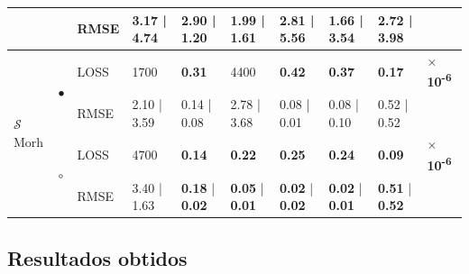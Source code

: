 \begin{table}
{\begin{tabular}{*{10}l}
            &                            & RMSE & 3.17 | 4.74                   & 2.90 | 1.20                   & 1.99 | 1.61                   & 2.81 | 5.56                   & 1.66 | 3.54                   & 2.72 | 3.98                   &                                          \\
            \hline
            \hline
            \multirow{4}{*}{$\mathcal{S}$Morh} & \multirow{2}{*}{$\bullet$} & LOSS & 1700                          & \textbf{0.31} & 4400 & \textbf{0.42} & \textbf{0.37} & \textbf{0.17} & $\times$ \textbf{10\textsuperscript{-6}} \\
            &                            & RMSE & 2.10 | 3.59                   & 0.14 | 0.08                   & 2.78 | 3.68                   & 0.08 | 0.01                   & 0.08 | 0.10                   & 0.52 | 0.52                   &                                          \\
            \cline{3-10}
            & \multirow{2}{*}{$\circ$}   & LOSS & 4700                          & \textbf{0.14}                 & \textbf{0.22}                 & \textbf{0.25}                 & \textbf{0.24} & \textbf{0.09} & $\times$ \textbf{10\textsuperscript{-6}} \\
            &                            & RMSE & 3.40 | 1.63                   & \textbf{0.18} | \textbf{0.02} & \textbf{0.05} | \textbf{0.01} & \textbf{0.02} | \textbf{0.02} & \textbf{0.02} | \textbf{0.01}  & \textbf{0.51} | \textbf{0.52} & \\
            \hline

        \end{tabular}
    }
\end{table}

\subsection{Resultados obtidos}
\label{subsec:resultados-obtidos}

